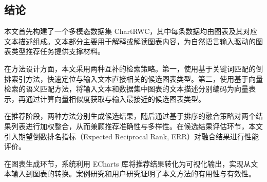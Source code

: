 \subsection{结论}

本文首先构建了一个多模态数据集 ChartRWC，其中每条数据均由图表及其对应文本描述组成。文本部分主要用于解释或解读图表内容，为自然语言输入驱动的图表类型推荐任务提供支撑材料。

在方法设计方面，本文采用两种互补的检索策略。第一，使用基于关键词匹配的倒排索引方法，快速定位与输入文本直接相关的候选图表类型。第二，使用基于向量检索的语义匹配方法，将输入文本和数据集中图表的文本描述分别编码为向量表示，再通过计算向量相似度获取与输入最接近的候选图表类型。

在推荐阶段，两种方法分别生成候选结果，随后通过基于排序的融合策略对两个结果列表进行加权整合，从而兼顾推荐准确性与多样性。在候选结果评估环节，本文引入期望倒数排名指标（Expected Reciprocal Rank, ERR）对融合结果进行性能评价。

在图表生成环节，系统利用 ECharts 库将推荐结果转化为可视化输出，实现从文本输入到图表的转换。案例研究和用户研究证明了本文方法的有用性与有效性。

\newpage
